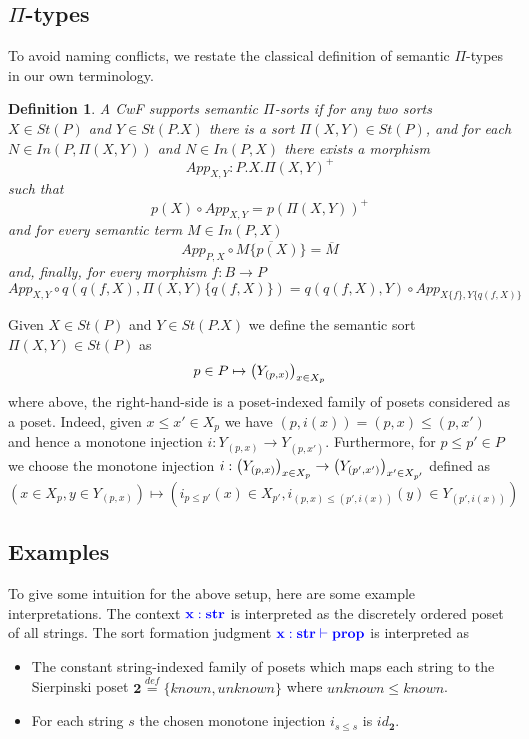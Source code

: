 \documentclass{article}
\newtheorem{lemma}{Lemma}
\newtheorem{definition}{Definition}
\newcommand{\blu}[1]{\mathbf{\color{blue}{#1}}}
\newcommand{\mbf}{\mathbf}
\newcommand{\defeq}{\overset{\mathit{def}}{=}}
\newcommand{\fm}[2]{
\left(
\tiny
#1
\normalsize
\right)_{#2}
}
\begin{document}
 
\subsection*{$\Pi$-types}

To avoid naming conflicts, we restate the classical definition of semantic $\Pi$-types in our own terminology.

\begin{definition}
A CwF supports semantic \emph{$\Pi$-sorts} if for any two sorts $X \in \mathit{St}(P)$ and $Y \in \mathit{St}(P . X)$ there is a sort $\Pi(X,Y) \in \mathit{St}(P)$, and for each $N \in \mathit{In}(P, \Pi(X,Y))$ and $N \in \mathit{In}(P,X)$ there exists a morphism
$$\mathit{App}_{X, Y} : P.X.\Pi(X,Y)^+$$
such that
$$p(X) \circ \mathit{App}_{X,Y} = p(\Pi(X,Y))^+$$
and for every semantic term $M \in \mathit{In}(P,X)$
$$\mathit{App}_{P,X} \circ \overline{M \{ p(X) \}} = \overline{M}$$
and, finally, for every morphism $f : B \to P$
$$\mathit{App}_{X,Y} \circ q(q(f,X), \Pi(X,Y) \{ q(f, X) \}) = q(q(f,X), Y) \circ \mathit{App}_{X \{ f \}, Y \{ q(f, X) \} }$$
\end{definition}

Given $X \in \mathit{St}(P)$ and $Y \in \mathit{St}(P . X)$ we define the semantic sort $\Pi(X,Y) \in \mathit{St}(P)$ as 
$$p \in P \mapsto \fm{Y_{(p,x)}}{x \in X_p}$$
where above, the right-hand-side is a poset-indexed family of posets considered as a poset. Indeed, given $x \leq x' \in X_p$ we have $(p, i(x)) = (p,x) \leq (p,x')$ and hence a monotone injection $i : Y_{(p,x)} \to Y_{(p,x')}$.
Furthermore, for $p \leq p' \in P$ we choose the monotone injection $i : \fm{Y_{(p,x)}}{x \in X_p} \to \fm{Y_{(p',x')}}{x' \in X_{p'}}$ defined as 
$$(x \in X_p, y \in Y_{(p,x)}) \mapsto (i_{p \leq p'}(x) \in X_{p'}, i_{(p,x) \leq (p',i(x))}(y) \in Y_{(p',i(x))})$$

\subsection*{Examples}

To give some intuition for the above setup, here are some example interpretations. The context $\blu{x : str}$ is interpreted as the discretely ordered poset of all strings. The sort formation judgment $\blu{x : str \vdash prop}$ is interpreted as 

\begin{itemize}
\item The constant string-indexed family of posets which maps each string to the Sierpinski poset $\mbf{2} \defeq \{ \mathit{known}, \mathit{unknown} \}$ where $\mathit{unknown} \leq \mathit{known}$.
\item For each string $s$ the chosen monotone injection $i_{s \leq s}$ is $\mathit{id}_{\mbf{2}}$.  
\end{itemize}
 
\end{document}
